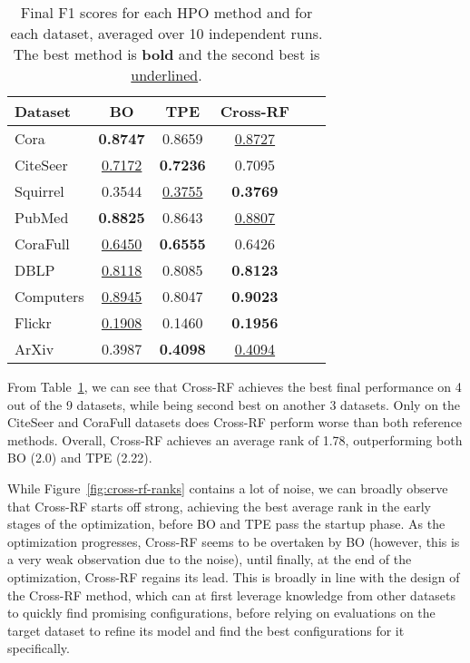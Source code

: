 \begin{table}
	\caption{Final F1 scores for each HPO method and for each dataset, averaged over 10 independent runs. The best method is \textbf{bold} and the second best is \underline{underlined}.}
	\label{tab:cross-rf-final-scores}
	\centering
	\begin{tabular}{lccccc}
		\toprule
		\textbf{Dataset} & \textbf{BO}        & \textbf{TPE}       & \textbf{Cross-RF}  \\
		\midrule
		Cora             & \textbf{0.8747}    & 0.8659             & \underline{0.8727} \\
		CiteSeer         & \underline{0.7172} & \textbf{0.7236}    & 0.7095             \\
		Squirrel         & 0.3544             & \underline{0.3755} & \textbf{0.3769}    \\
		PubMed           & \textbf{0.8825}    & 0.8643             & \underline{0.8807} \\
		CoraFull         & \underline{0.6450} & \textbf{0.6555}    & 0.6426             \\
		DBLP             & \underline{0.8118} & 0.8085             & \textbf{0.8123}    \\
		Computers        & \underline{0.8945} & 0.8047             & \textbf{0.9023}    \\
		Flickr           & \underline{0.1908} & 0.1460             & \textbf{0.1956}    \\
		ArXiv            & 0.3987             & \textbf{0.4098}    & \underline{0.4094} \\
		\bottomrule
	\end{tabular}
\end{table}

\begin{figure*}
	\centering
	\resizebox{\linewidth}{!}{%
		
	}
	\caption{Ranks-over-time of Cross-RF and reference methods over the progress of the optimization, aggreagated over 10 independent runs for each of 9 datasets.}
	\label{fig:cross-rf-ranks}
\end{figure*}

From Table~\ref{tab:cross-rf-final-scores}, we can see that Cross-RF achieves the best final performance on 4 out of the 9 datasets, while being second best on another 3 datasets. Only on the CiteSeer and CoraFull datasets does Cross-RF perform worse than both reference methods. Overall, Cross-RF achieves an average rank of 1.78, outperforming both BO (2.0) and TPE (2.22).

While Figure~\ref{fig:cross-rf-ranks} contains a lot of noise, we can broadly observe that Cross-RF starts off strong, achieving the best average rank in the early stages of the optimization, before BO and TPE pass the startup phase. As the optimization progresses, Cross-RF seems to be overtaken by BO (however, this is a very weak observation due to the noise), until finally, at the end of the optimization, Cross-RF regains its lead. This is broadly in line with the design of the Cross-RF method, which can at first leverage knowledge from other datasets to quickly find promising configurations, before relying on evaluations on the target dataset to refine its model and find the best configurations for it specifically.
